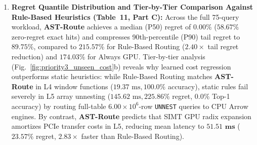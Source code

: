 \documentclass[10pt,a4paper]{article}
\begin{document}
\begin{enumerate}[leftmargin=1.5em,itemsep=2pt]
\item \textbf{Regret Quantile Distribution and Tier-by-Tier Comparison Against Rule-Based Heuristics (Table~11, Part C):} Across the full 75-query workload, \textbf{AST-Route} achieves a median (P50) regret of $\mathbf{0.00\%}$ ($58.67\%$ zero-regret exact hits) and compresses 90th-percentile (P90) tail regret to $\mathbf{89.75\%}$, compared to $215.57\%$ for Rule-Based Routing ($2.40\times$ tail regret reduction) and $174.03\%$ for Always GPU. Tier-by-tier analysis (Fig.~\ref{fig:priority3_unseen_cost}b) reveals why learned cost regression outperforms static heuristics: while Rule-Based Routing matches \textbf{AST-Route} in L4 window functions ($19.37\text{ ms}, 100.0\%$ accuracy), static rules fail severely in L5 array unnesting ($145.62\text{ ms}, 225.86\%$ regret, $0.0\%$ Top-1 accuracy) by routing full-table $6.00\times 10^6$-row \texttt{UNNEST} queries to CPU Arrow engines. By contrast, \textbf{AST-Route} predicts that SIMT GPU radix expansion amortizes PCIe transfer costs in L5, reducing mean latency to $\mathbf{51.51\text{ ms}}$ ($23.57\%$ regret, $\mathbf{2.83\times}$ faster than Rule-Based Routing).
\end{enumerate}
\end{document}
